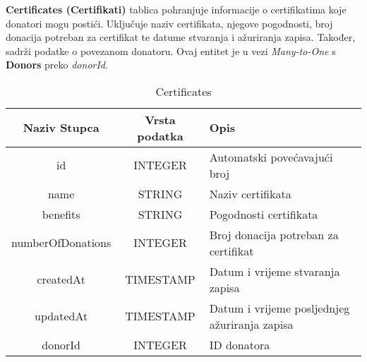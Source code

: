 				\noindent\textbf{Certificates (Certifikati)} tablica pohranjuje informacije o certifikatima koje donatori mogu postići. Uključuje naziv certifikata, njegove pogodnosti, broj donacija potreban za certifikat te datume stvaranja i ažuriranja zapisa. Također, sadrži podatke o povezanom donatoru. Ovaj entitet je u vezi \textit{Many-to-One} s \textbf{Donors} preko \textit{donorId}.
				\begin{table}[H]
				    \renewcommand{\arraystretch}{2}
				    \centering
				     \begin{tabularx}{1\textwidth}{|c|c|X|}
				    \hline
				    \textbf{Naziv Stupca} & \textbf{Vrsta podatka} & \textbf{Opis} \\
				    \hline
				    \cellcolor{LightGreen} id & INTEGER & Automatski povećavajući broj\\
				    \hline
				    name & STRING & Naziv certifikata \\
				    \hline
				    benefits & STRING & Pogodnosti certifikata \\
				    \hline
				    numberOfDonations & INTEGER & Broj donacija potreban za certifikat \\
				    \hline
				    createdAt & TIMESTAMP & Datum i vrijeme stvaranja zapisa \\
				    \hline
				    updatedAt & TIMESTAMP & Datum i vrijeme posljednjeg ažuriranja zapisa \\
				    \hline
				    \cellcolor{LightBlue} donorId & INTEGER & ID donatora \\
				    \hline
				    \end{tabularx}
				    \caption{Certificates}
				    \label{tab:my_label}
				\end{table}
				\clearpage %
				
